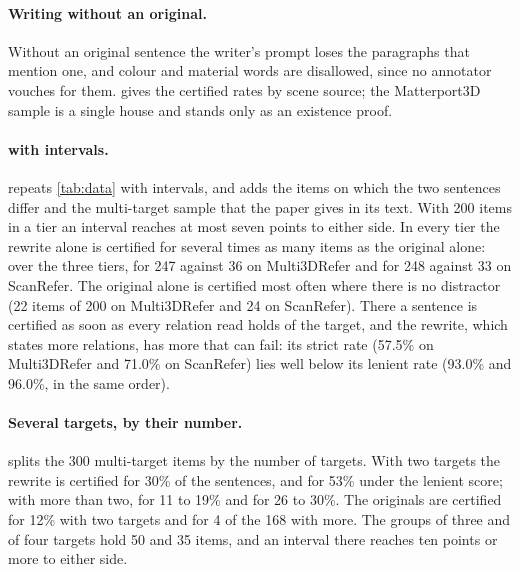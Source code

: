 \paragraph{Writing without an original.}
Without an original sentence the writer's prompt loses the paragraphs that mention one, and colour and material words are disallowed, since no annotator vouches for them.
 gives the certified rates by scene source; the Matterport3D sample is a single house and stands only as an existence proof.


\paragraph{ with intervals.}
 repeats \cref{tab:data} with intervals, and adds the items on which the two sentences differ and the multi-target sample that the paper gives in its text.
With 200 items in a tier an interval reaches at most seven points to either side.
In every tier the rewrite alone is certified for several times as many items as the original alone: over the three tiers, for 247 against 36 on Multi3DRefer and for 248 against 33 on ScanRefer.
The original alone is certified most often where there is no distractor (22 items of 200 on Multi3DRefer and 24 on ScanRefer).
There a sentence is certified as soon as every relation read holds of the target, and the rewrite, which states more relations, has more that can fail: its strict rate (57.5\% on Multi3DRefer and 71.0\% on ScanRefer) lies well below its lenient rate (93.0\% and 96.0\%, in the same order).


\paragraph{Several targets, by their number.}
 splits the 300 multi-target items by the number of targets.
With two targets the rewrite is certified for 30\% of the sentences, and for 53\% under the lenient score; with more than two, for 11 to 19\% and for 26 to 30\%.
The originals are certified for 12\% with two targets and for 4 of the 168 with more.
The groups of three and of four targets hold 50 and 35 items, and an interval there reaches ten points or more to either side.


